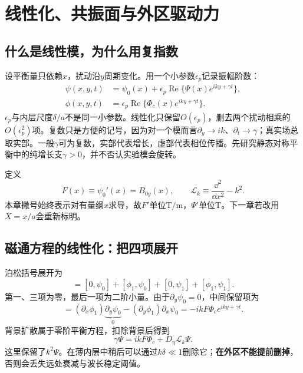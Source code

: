 \chapter{线性化、共振面与外区驱动力}\label{tm:linear}
\section{什么是线性模，为什么用复指数}
设平衡量只依赖$x$，扰动沿$y$周期变化。用一个小参数$\epsilon_p$记录振幅阶数：
\begin{align}
 \psi(x,y,t)&=\psi_0(x)+\epsilon_p\operatorname{Re}\{\Psi(x)e^{iky+\gamma t}\},\\
 \phi(x,y,t)&=\epsilon_p\operatorname{Re}\{\Phi_c(x)e^{iky+\gamma t}\}.
 \label{tm:ansatz}
\end{align}
$\epsilon_p$与内层尺度$\delta/a$不是同一小参数。线性化只保留$O(\epsilon_p)$，删去两个扰动相乘的$O(\epsilon_p^2)$项。复数只是方便的记号，因为对一个模而言$\partial_y\to ik$、$\partial_t\to\gamma$；真实场总取实部。一般$\gamma$可为复数，实部代表增长，虚部代表相位传播。先研究静态对称平衡中的纯增长支$\gamma>0$，并不否认实验模会旋转。

定义
\begin{equation}
 F(x)\equiv\psi_0'(x)=B_{0y}(x),\qquad
 \mathcal L_k\equiv\frac{\dd^2}{\dd x^2}-k^2.
\end{equation}
本章撇号始终表示对有量纲$x$求导，故$F'$单位$\mathrm{T/m}$，$\Psi'$单位T。下一章若改用$X=x/a$会重新标明。

\section{磁通方程的线性化：把四项展开}
泊松括号展开为
\begin{equation}
 [\phi,\psi]=[0,\psi_0]+[\phi_1,\psi_0]+[0,\psi_1]+[\phi_1,\psi_1].
\end{equation}
第一、三项为零，最后一项为二阶小量。由于$\partial_y\psi_0=0$，中间保留项为
\begin{equation}
 [\phi_1,\psi_0]=(\partial_x\phi_1)\underbrace{\partial_y\psi_0}_{0}
 -(\partial_y\phi_1)\partial_x\psi_0=-ikF\Phi_c e^{iky+\gamma t}.
\end{equation}
背景扩散属于零阶平衡方程，扣除背景后得到
\begin{equation}
 \boxed{\gamma\Psi=ikF\Phi_c+D_\eta\mathcal L_k\Psi.}
 \label{tm:linind}
\end{equation}
这里保留了$k^2\Psi$。在薄内层中稍后可以通过$k\delta\ll1$删除它；\textbf{在外区不能提前删掉}，否则会丢失远处衰减与波长稳定阈值。


